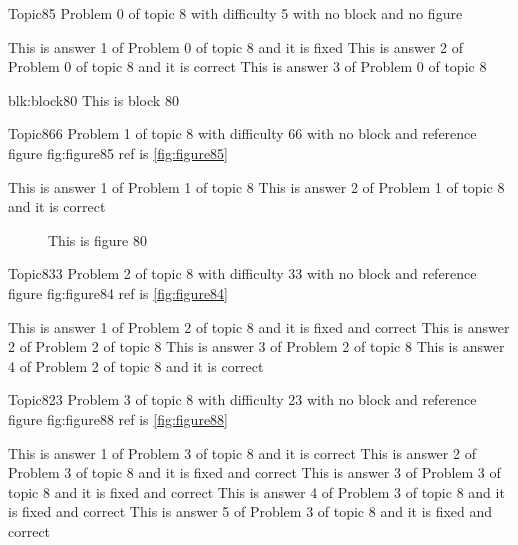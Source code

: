 \documentclass[master]{exam}
\begin{document}
\begin{problem}{Topic8}{5}
	Problem 0 of topic 8 with difficulty 5 with no block and no figure
	\begin{answers}
		\answer[fixed] This is answer 1 of Problem 0 of topic 8 and it is fixed
		\answer[correct] This is answer 2 of Problem 0 of topic 8 and it is correct
		\answer This is answer 3 of Problem 0 of topic 8 
	\end{answers}
\end{problem}



\begin{block}{blk:block80}
This is block 80
\end{block}


\begin{problem}{Topic8}{66}
	Problem 1 of topic 8 with difficulty 66 with no block and reference figure fig:figure85 ref is \ref{fig:figure85}
	\begin{answers}
		\answer This is answer 1 of Problem 1 of topic 8 
		\answer[correct] This is answer 2 of Problem 1 of topic 8 and it is correct
	\end{answers}
\end{problem}



\begin{figure}
	\begin{center}
		This is figure 80 
		\label{fig:figure80}
	\end{center}
\end{figure}

\begin{problem}{Topic8}{33}
	Problem 2 of topic 8 with difficulty 33 with no block and reference figure fig:figure84 ref is \ref{fig:figure84}
	\begin{answers}
		 This is answer 1 of Problem 2 of topic 8 and it is fixed and correct
		\answer This is answer 2 of Problem 2 of topic 8 
		\answer This is answer 3 of Problem 2 of topic 8 
		\answer[correct] This is answer 4 of Problem 2 of topic 8 and it is correct
	\end{answers}
\end{problem}

\begin{problem}{Topic8}{23}
	Problem 3 of topic 8 with difficulty 23 with no block and reference figure fig:figure88 ref is \ref{fig:figure88}
	\begin{answers}
		\answer[correct] This is answer 1 of Problem 3 of topic 8 and it is correct
		 This is answer 2 of Problem 3 of topic 8 and it is fixed and correct
		 This is answer 3 of Problem 3 of topic 8 and it is fixed and correct
		 This is answer 4 of Problem 3 of topic 8 and it is fixed and correct
		 This is answer 5 of Problem 3 of topic 8 and it is fixed and correct
	\end{answers}
\end{problem}
\end{document}

